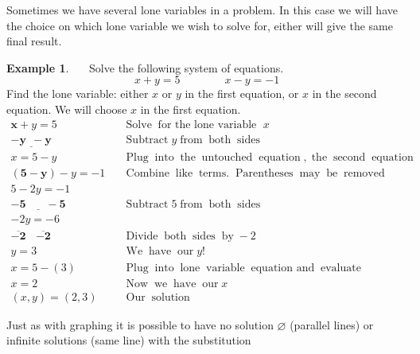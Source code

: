 \documentclass[12pt]{book}
\theoremstyle{definition}
\newtheorem{example}{Example}
\newcommand{\tmmathbf}[1]{\ensuremath{\boldsymbol{#1}}}
\newcommand{\tmop}[1]{\ensuremath{\operatorname{#1}}}
\begin{document}
Sometimes we have several lone variables in a problem. In this case we will have the choice on which lone variable we wish to solve for, either will give
the same final result.
\begin{example}~~~Solve the following system of equations.
    $$x + y = 5\qquad\qquad x - y = - 1$$
Find the lone variable: either $x$ or $y$ in the first equation, or $x$ in the second equation.  We will choose $x$ in the first equation.
  \begin{eqnarray*}
    \tmmathbf{x} + y = 5~~~~~ &  & \tmop{Solve} \tmop{for~the~lone~variable~} x\\
    \tmmathbf{\underline{- y ~~- y}}~~ &  &  \tmop{Subtract} y \tmop{from} \tmop{both} \tmop{sides}\\
    x = 5 - y &  & \tmop{Plug} \tmop{into} \tmop{the} \tmop{untouched}
    \tmop{equation}, \tmop{the} \tmop{second} \tmop{equation}\\
    \tmmathbf{(5 - y)} - y = - 1 &  & \tmop{Combine}
    \tmop{like} \tmop{terms.} \tmop{Parentheses}
    \tmop{may} \tmop{be} \tmop{removed} \\
    5 - 2 y = - 1 &  &\\
    \tmmathbf{\underline{- 5 ~~~~~~~~- 5}} &  &  \tmop{Subtract} 5 \tmop{from} \tmop{both}
    \tmop{sides}\\
    - 2 y = - 6 &  &\\
    \tmmathbf{\overline{- 2} ~~~~ \overline{- 2}} &  &  \tmop{Divide} \tmop{both} \tmop{sides} \tmop{by} - 2\\
    y = 3~~ &  & \tmop{We} \tmop{have} \tmop{our} y!\\
    x = 5 - (3) &  & \tmop{Plug} \tmop{into} \tmop{lone} \tmop{variable}
    \tmop{equation~and} \tmop{evaluate}\\
    x = 2~~~~~~~ &  & \tmop{Now} \tmop{we} \tmop{have} \tmop{our} x\\
    (x,y)=(2, 3) &  & \tmop{Our} \tmop{solution}
  \end{eqnarray*}
\end{example}
Just as with graphing it is possible to have no solution $\varnothing$ (parallel lines) or infinite solutions (same line) with the substitution
\end{document}
